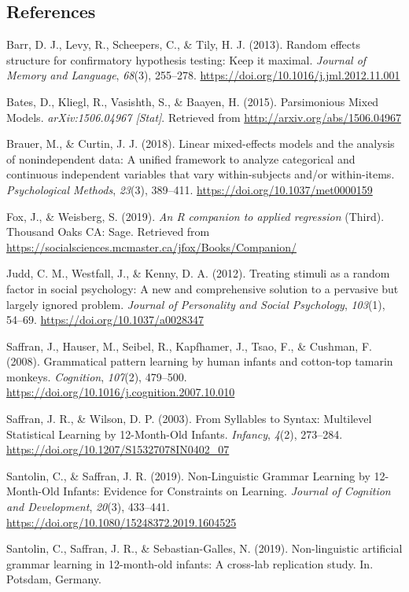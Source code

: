 \documentclass[english,man,man,floatsintext]{apa6}
\begin{document}
\begin{appendix}
\hypertarget{references}{%
\subsection{References}\label{references}}

\begingroup
\setlength{\parindent}{-0.5in}
\setlength{\leftskip}{0.5in}

\hypertarget{refs}{}
\leavevmode\hypertarget{ref-barr2013}{}%
Barr, D. J., Levy, R., Scheepers, C., \& Tily, H. J. (2013). Random
effects structure for confirmatory hypothesis testing: Keep it maximal.
\emph{Journal of Memory and Language}, \emph{68}(3), 255--278.
\url{https://doi.org/10.1016/j.jml.2012.11.001}

\leavevmode\hypertarget{ref-bates2015a}{}%
Bates, D., Kliegl, R., Vasishth, S., \& Baayen, H. (2015). Parsimonious
Mixed Models. \emph{arXiv:1506.04967 {[}Stat{]}}. Retrieved from
\url{http://arxiv.org/abs/1506.04967}

\leavevmode\hypertarget{ref-brauer2018}{}%
Brauer, M., \& Curtin, J. J. (2018). Linear mixed-effects models and the
analysis of nonindependent data: A unified framework to analyze
categorical and continuous independent variables that vary
within-subjects and/or within-items. \emph{Psychological Methods},
\emph{23}(3), 389--411. \url{https://doi.org/10.1037/met0000159}

\leavevmode\hypertarget{ref-fox2019}{}%
Fox, J., \& Weisberg, S. (2019). \emph{An R companion to applied
regression} (Third). Thousand Oaks CA: Sage. Retrieved from
\url{https://socialsciences.mcmaster.ca/jfox/Books/Companion/}

\leavevmode\hypertarget{ref-judd2012}{}%
Judd, C. M., Westfall, J., \& Kenny, D. A. (2012). Treating stimuli as a
random factor in social psychology: A new and comprehensive solution to
a pervasive but largely ignored problem. \emph{Journal of Personality
and Social Psychology}, \emph{103}(1), 54--69.
\url{https://doi.org/10.1037/a0028347}

\leavevmode\hypertarget{ref-saffran2008}{}%
Saffran, J., Hauser, M., Seibel, R., Kapfhamer, J., Tsao, F., \&
Cushman, F. (2008). Grammatical pattern learning by human infants and
cotton-top tamarin monkeys. \emph{Cognition}, \emph{107}(2), 479--500.
\url{https://doi.org/10.1016/j.cognition.2007.10.010}

\leavevmode\hypertarget{ref-saffran2003}{}%
Saffran, J. R., \& Wilson, D. P. (2003). From Syllables to Syntax:
Multilevel Statistical Learning by 12-Month-Old Infants. \emph{Infancy},
\emph{4}(2), 273--284. \url{https://doi.org/10.1207/S15327078IN0402_07}

\leavevmode\hypertarget{ref-santolin2019}{}%
Santolin, C., \& Saffran, J. R. (2019). Non-Linguistic Grammar Learning
by 12-Month-Old Infants: Evidence for Constraints on Learning.
\emph{Journal of Cognition and Development}, \emph{20}(3), 433--441.
\url{https://doi.org/10.1080/15248372.2019.1604525}

\leavevmode\hypertarget{ref-santolin2019a}{}%
Santolin, C., Saffran, J. R., \& Sebastian-Galles, N. (2019).
Non-linguistic artificial grammar learning in 12-month-old infants: A
cross-lab replication study. In. Potsdam, Germany.

\endgroup
\end{appendix}
\end{document}
